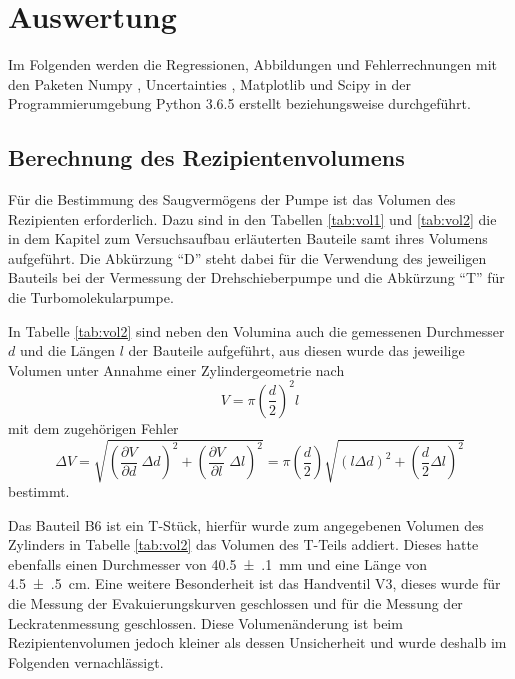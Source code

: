 \newpage
\section{Auswertung}
\label{sec:Auswertung}

Im Folgenden werden die Regressionen, Abbildungen und Fehlerrechnungen mit den
Paketen Numpy \cite{numpy}, Uncertainties \cite{uncertainties}, Matplotlib
\cite{matplotlib} und Scipy \cite{scipy} in der Programmierumgebung
Python 3.6.5 erstellt beziehungsweise durchgeführt.

\subsection{Berechnung des Rezipientenvolumens}
\label{sec:Volumina}

Für die Bestimmung des Saugvermögens der Pumpe ist das Volumen des Rezipienten
erforderlich. Dazu sind in den Tabellen \ref{tab:vol1} und \ref{tab:vol2} die
in dem Kapitel zum Versuchsaufbau erläuterten Bauteile samt ihres Volumens aufgeführt.
Die Abkürzung \enquote{D} steht dabei für die Verwendung
des jeweiligen Bauteils bei der Vermessung der
Drehschieberpumpe und die Abkürzung \enquote{T} für die Turbomolekularpumpe.



In Tabelle \ref{tab:vol2} sind neben den Volumina auch die gemessenen
Durchmesser $d$ und die Längen $l$ der Bauteile aufgeführt, aus diesen wurde
das jeweilige Volumen unter Annahme einer Zylindergeometrie nach
\begin{equation*}
  V = \pi \left(\frac{d}{2}\right)^2 l
\end{equation*}
mit dem zugehörigen Fehler
\begin{equation*}
  \Delta V =
  \sqrt{\left(\frac{\partial V}{\partial d} \;\Delta d\right)^2 +
  \left(\frac{\partial V}{\partial l} \;\Delta l\right)^2} =
  \pi \left(\frac{d}{2}\right) \sqrt{
  \left(l \Delta d \right)^2 +
  \left( \frac{d}{2} \Delta l\right)^2}
\end{equation*}
bestimmt.



Das Bauteil B6 ist ein T-Stück, hierfür wurde zum angegebenen Volumen des Zylinders
in Tabelle \ref{tab:vol2}
das Volumen des T-Teils addiert. Dieses hatte ebenfalls einen Durchmesser
von \SI{40.5(1)}{\milli\meter} und eine Länge von \SI{4.5(5)}{\centi\meter}.
Eine weitere Besonderheit ist das Handventil V3, dieses wurde für die Messung
der Evakuierungskurven geschlossen und für die Messung der Leckratenmessung
geschlossen. Diese Volumenänderung ist beim Rezipientenvolumen jedoch kleiner
als dessen Unsicherheit und
wurde deshalb im Folgenden vernachlässigt.

